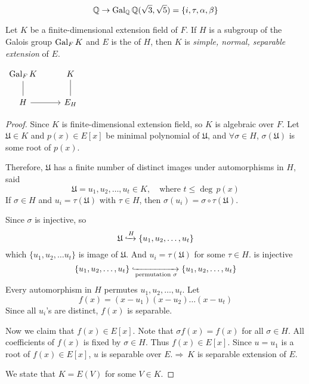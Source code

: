 \begin{example}
    \[
        \mathbb{Q} \rightarrow \operatorname{Gal}_\mathbb{Q} \mathbb{Q}(\sqrt{3}, \sqrt{5}) = \{i, \tau, \alpha, \beta \}
    \]
\end{example}

\begin{lemma}
    Let $K$ be a finite-dimensional extension field of $F$. If $H$ is a subgroup of the Galois group 
    $\operatorname{Gal}_F K$ and $E$ is the  of $H$, then $K$ is 
    \textit{simple, normal, separable extension} of $E$.

    \begin{center}
        $\begin{tikzcd}
            \gal_F K  
            & K \arrow[dash]{d} \\
            H \arrow[dash]{u} \arrow[r]
            & E_H
            \end{tikzcd}
        $
    \end{center}
\end{lemma}
\begin{proof}
    Since $K$ is finite-dimensional extension field, so $K$ is algebraic over $F$. Let $\mathfrak{U} \in K$ and 
    $p(x) \in E[x]$ be minimal polynomial of $\mathfrak{U}$, and $\forall \sigma \in H$, $\sigma(\mathfrak{U})$ is 
    some root of $p(x)$.

    Therefore, $\mathfrak{U}$ has a finite number of distinct images under automorphisms in $H$, said 
    \[
        \mathfrak{U} = u_1, u_2, \ldots, u_t \in K, \quad \text{where } t \leq \deg\, p(x)
    \]
    If $\sigma \in H$ and $u_i = \tau(\mathfrak{U})$ with $\tau \in H$, then $\sigma(u_i) = \sigma \circ \tau (\mathfrak{U})$.

    Since $\sigma$ is injective, so 
    \[
        \mathfrak{U} \xhookrightarrow{H} \{ u_1, u_2, \ldots, u_t \}
    \]
    which $\{ u_1, u_2, \ldots u_t\}$ is image of $\mathfrak{U}$. And $u_i = \tau(\mathfrak{U})$ for some $\tau \in H$.
    is injective 
    \[
        \{ u_1, u_2, \ldots, u_t \} \xhookrightarrow[\text{permutation } \sigma]{} \{ u_1, u_2, \ldots, u_t \}
    \]
    Every automorphism in $H$ permutes $u_1, u_2, \ldots, u_t$. Let 
    \[
        f(x) = (x-u_1)(x-u_2)\ldots(x-u_t)
    \]
    Since all $u_i$'s are distinct, $f(x)$ is separable.

    Now we claim that $f(x) \in E[x]$. Note that $\sigma f(x) = f(x)$ for all $\sigma \in H$. All coefficients of 
    $f(x)$ is fixed by $\sigma \in H$. Thus $f(x) \in E[x]$. Since $u = u_1$ is a root of $f(x) \in E[x]$, $u$ is separable over 
    $E. \Longrightarrow \> K$ is separable extension of $E$.

    We state that $K = E(V)$ for some $V \in K$. 
\end{proof}